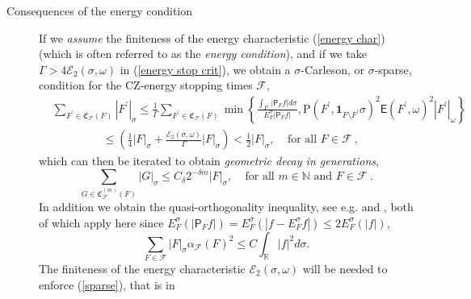 \documentclass{amsart}%
\theoremstyle{plain}
\numberwithin{equation}{section}
\begin{document}
\begin{description}
\item[Consequences of the energy condition] If we \emph{assume} the finiteness
of the energy characteristic (\ref{energy char}) (which is often referred to
as the \emph{energy condition}), and if we take $\Gamma>4\mathcal{E}%
_{2}\left(  \sigma,\omega\right)  $ in (\ref{energy stop crit}), we obtain a
$\sigma$-Carleson, or $\sigma$-sparse, condition for the CZ-energy stopping
times $\mathcal{F}$,%
\begin{align*}
& \sum_{F^{\prime}\in\mathfrak{C}_{\mathcal{F}}\left(  F\right)  }\left\vert
F^{\prime}\right\vert _{\sigma}\leq\frac{1}{\Gamma}\sum_{F^{\prime}%
\in\mathfrak{C}_{\mathcal{F}}\left(  F\right)  }\min\left\{  \frac
{\int_{F^{\prime}}\left\vert \mathsf{P}_{F}f\right\vert d\sigma}{E_{F}%
^{\sigma}\left\vert \mathsf{P}_{F}f\right\vert },\mathrm{P}\left(  F^{\prime
},\mathbf{1}_{F\setminus F^{\prime}}\sigma\right)  ^{2}\mathsf{E}\left(
F^{\prime},\omega\right)  ^{2}\left\vert F^{\prime}\right\vert _{\omega
}\right\} \\
& \ \ \ \ \ \ \ \ \ \ \ \ \ \ \ \ \ \ \ \ \leq\left(  \frac{1}{4}\left\vert
F\right\vert _{\sigma}+\frac{\mathcal{E}_{2}\left(  \sigma,\omega\right)
}{\Gamma}\left\vert F\right\vert _{\sigma}\right)  <\frac{1}{2}\left\vert
F\right\vert _{\sigma},\ \ \ \ \ \text{for all }F\in\mathcal{F}\ ,
\end{align*}
which can then be iterated to obtain \emph{geometric decay in generations},
\begin{equation}
\sum_{G\in\mathfrak{C}_{\mathcal{F}}^{\left(  m\right)  }\left(  F\right)
}\left\vert G\right\vert _{\sigma}\leq C_{\delta}2^{-\delta m}\left\vert
F\right\vert _{\sigma},\ \ \ \ \ \text{for all }m\in\mathbb{N}\text{ and }%
F\in\mathcal{F}\ .\label{sparse}%
\end{equation}
In addition we obtain the quasi-orthogonality inequality, see e.g.
\cite{LaSaShUr3} and \cite{SaShUr7}, both of which apply here since
$E_{F}^{\sigma}\left(  \left\vert \mathsf{P}_{F}f\right\vert \right)
=E_{F}^{\sigma}\left(  \left\vert f-E_{F}^{\sigma}f\right\vert \right)
\leq2E_{F}^{\sigma}\left(  \left\vert f\right\vert \right)  $,%
\begin{equation}
\sum_{F\in\mathcal{F}}\left\vert F\right\vert _{\sigma}\alpha_{\mathcal{F}%
}\left(  F\right)  ^{2}\leq C\int_{\mathbb{R}}\left\vert f\right\vert
^{2}d\sigma.\label{qorth}%
\end{equation}
The finiteness of the energy characteristic $\mathcal{E}_{2}\left(
\sigma,\omega\right)  $ will be needed to enforce (\ref{sparse}), that is in

\end{description}
\end{document}
